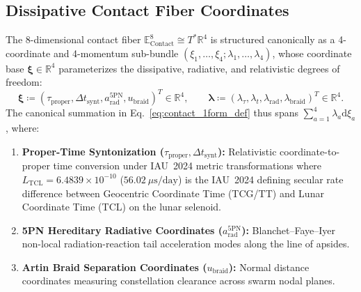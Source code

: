 \documentclass[11pt,a4paper,reqno]{article}
\theoremstyle{plain}
\theoremstyle{definition}
\theoremstyle{remark}
\numberwithin{equation}{section}
\numberwithin{table}{section}
\newcommand{\Econtact}{\mathbb{E}_{\mathrm{Contact}}^8}
\providecommand{\diff}{\mathrm{d}}
\begin{document}
\subsection{Dissipative Contact Fiber Coordinates}
The 8-dimensional contact fiber $\Econtact \cong T^*\mathbb{R}^4$ is structured canonically as a 4-coordinate and 4-momentum sub-bundle $(\xi_1, \dots, \xi_4; \lambda_1, \dots, \lambda_4)$, whose coordinate base $\bm{\xi} \in \mathbb{R}^4$ parameterizes the dissipative, radiative, and relativistic degrees of freedom:
\begin{equation}
  \bm{\xi} \coloneqq \left( \tau_{\mathrm{proper}}, \Delta t_{\mathrm{synt}}, a_{\mathrm{rad}}^{5\mathrm{PN}}, u_{\mathrm{braid}} \right)^T \in \mathbb{R}^4, \qquad \bm{\lambda} \coloneqq \left( \lambda_\tau, \lambda_t, \lambda_{\mathrm{rad}}, \lambda_{\mathrm{braid}} \right)^T \in \mathbb{R}^4.
  \label{eq:contact_fiber_coords}
\end{equation}
The canonical summation in Eq.~\eqref{eq:contact_1form_def} thus spans $\sum_{a=1}^4 \lambda_a \diff\xi_a$, where:
\begin{enumerate}[label=(\alph*)]
  \item \textbf{Proper-Time Syntonization ($\tau_{\mathrm{proper}}, \Delta t_{\mathrm{synt}}$):} Relativistic coordinate-to-proper time conversion under IAU~2024 metric transformations where $L_{\mathrm{TCL}} = 6.4839 \times 10^{-10}$ ($56.02\ \mu\text{s/day}$) is the IAU~2024 defining secular rate difference between Geocentric Coordinate Time (TCG/TT) and Lunar Coordinate Time (TCL) on the lunar selenoid.
  \item \textbf{5PN Hereditary Radiative Coordinates ($a_{\mathrm{rad}}^{5\mathrm{PN}}$):} Blanchet--Faye--Iyer non-local radiation-reaction tail acceleration modes along the line of apsides.
  \item \textbf{Artin Braid Separation Coordinates ($u_{\mathrm{braid}}$):} Normal distance coordinates measuring constellation clearance across swarm nodal planes.
\end{enumerate}
\end{document}

